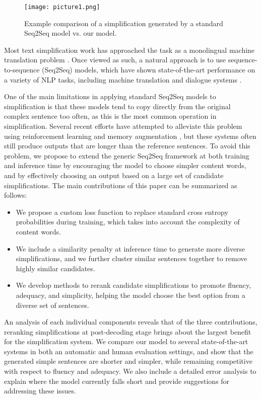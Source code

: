 \documentclass[11pt,a4paper]{article}
\begin{document}
\begin{figure}[bt]
    \centering
\texttt{[image: picture1.png]}
\caption{Example comparison of a simplification generated by a standard Seq2Seq model vs. our model.}
\label{example}
\end{figure}

Most text simplification work has approached the task as a monolingual machine translation problem \cite{woodsend2011learning,narayan2014hybrid}. Once viewed as such, a natural approach is to use sequence-to-sequence (Seq2Seq) models, which have shown state-of-the-art performance on a variety of NLP tasks, including machine translation \cite{vaswani2017attention} and dialogue systems \cite{vinyals2015neural}.

One of the main limitations in applying standard Seq2Seq models to simplification is that these models tend to copy directly from the original complex sentence too often, as this is the most common operation in simplification. Several recent efforts have attempted to alleviate this problem using reinforcement learning \cite{zhang2017sentence} and memory augmentation \cite{zhao2018integrating}, but these systems often still produce outputs that are longer than the reference sentences. To avoid this problem, we propose to extend the generic Seq2Seq framework at both training and inference time by encouraging the model to choose simpler content words, and by
effectively choosing an output based on a large set of 
candidate simplifications. The main contributions of this paper can be summarized as follows:
\begin{itemize}
    \item We propose a custom loss function to replace standard cross entropy probabilities during training, which takes into account the complexity of content words.
    \item We include a similarity penalty at inference time to generate more diverse simplifications, and we further cluster similar sentences together to remove highly similar candidates.
    \item We develop methods to rerank candidate simplifications to promote fluency, adequacy, and simplicity, helping the model choose the best option from a diverse set of sentences.
\end{itemize}

An analysis of each individual components reveals that of the three contributions, reranking simplifications at post-decoding stage brings about the largest benefit for the simplification system. We compare our model to several state-of-the-art systems in both an automatic and human evaluation settings, and show that the generated simple sentences are shorter and simpler, while remaining competitive with respect to fluency and adequacy. We also include a detailed error analysis to explain where the model currently falls short and provide suggestions for addressing these issues.
\end{document}
